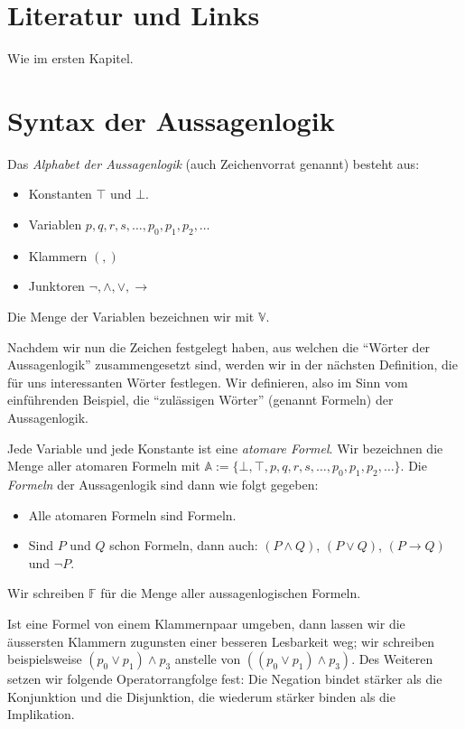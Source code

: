 \section*{Literatur und Links}
Wie im ersten Kapitel.

\section{Syntax der Aussagenlogik}


\begin{df}
Das \textit{Alphabet der Aussagenlogik} (auch Zeichenvorrat genannt) besteht aus:
\begin{itemize}
\item Konstanten $\top$ und $\bot$.
\item Variablen $p,q,r,s,\dots,p_0,p_1,p_2,\dots$
\item Klammern $(,)$
\item Junktoren $\neg,\land,\lor,\to$
\end{itemize}
Die Menge der Variablen bezeichnen wir mit $\mathbb{V}$.
\end{df}

Nachdem wir nun die Zeichen festgelegt haben, aus welchen die ``Wörter der
Aussagenlogik'' zusammengesetzt sind, werden
wir in der nächsten Definition, die für uns interessanten Wörter festlegen. Wir
definieren, also im Sinn vom einführenden Beispiel, die
``zulässigen Wörter'' (genannt Formeln) der Aussagenlogik.

\begin{df}
Jede Variable und jede Konstante ist eine \textit{atomare Formel}. Wir bezeichnen die
Menge aller atomaren Formeln mit $\mathbb{A}:=\{\bot,\top,p,q,r,s,\dots,p_0,p_1,p_2,\dots
\}$.
Die \textit{Formeln} der Aussagenlogik sind dann wie folgt gegeben:
\begin{itemize}
\item Alle atomaren Formeln sind Formeln.
\item Sind $P$ und $Q$ schon Formeln, dann auch: $(P\land Q)$, $(P\lor Q)$, $(P\to Q)$ und $\neg P$.
\end{itemize}
Wir schreiben $\mathbb{F}$ für die Menge aller aussagenlogischen Formeln.
\end{df}

\begin{rk} Ist eine Formel von einem Klammernpaar umgeben, dann lassen wir die äussersten
    Klammern
zugunsten einer besseren Lesbarkeit weg; wir schreiben beispielsweise $(p_0\lor p_1)\land
p_3$ anstelle von $((p_0\lor p_1)\land p_3)$. Des Weiteren setzen wir folgende Operatorrangfolge fest: Die Negation bindet stärker als die Konjunktion und die Disjunktion, die wiederum stärker binden als die Implikation.
\end{rk}

